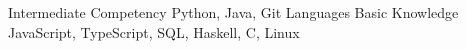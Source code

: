 \begin{cvhonors}
  \cvhonor
    {Intermediate Competency}
    {Python, Java, Git}
    {}
    {Languages}
  \cvhonor
    {Basic Knowledge}
    {JavaScript, TypeScript, SQL, Haskell, C, Linux}
    {}
    {}
\end{cvhonors}